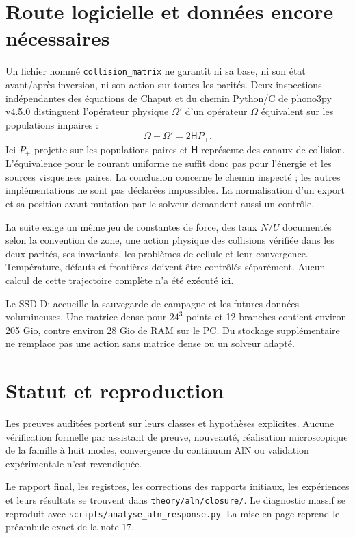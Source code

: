 \documentclass[11pt,a4paper]{article}
\begin{document}
\section{Route logicielle et données encore nécessaires}
Un fichier nommé \texttt{collision\_matrix} ne garantit ni sa base, ni son état avant/après inversion, ni son action sur toutes les parités.
Deux inspections indépendantes des équations de Chaput et du chemin Python/C de phono3py v4.5.0 distinguent l'opérateur physique $\Omega'$ d'un opérateur $\Omega$ équivalent sur les populations impaires :
\[
 \Omega-\Omega'=2\mathsf H P_+ .
\]
Ici $P_+$ projette sur les populations paires et $\mathsf H$ représente des canaux de collision.
L'équivalence pour le courant uniforme ne suffit donc pas pour l'énergie et les sources visqueuses paires.
La conclusion concerne le chemin inspecté ; les autres implémentations ne sont pas déclarées impossibles. La normalisation d'un export et sa position avant mutation par le solveur demandent aussi un contrôle.

La suite exige un même jeu de constantes de force, des taux $N/U$ documentés selon la convention de zone, une action physique des collisions vérifiée dans les deux parités, ses invariants, les problèmes de cellule et leur convergence. Température, défauts et frontières doivent être contrôlés séparément. Aucun calcul de cette trajectoire complète n'a été exécuté ici.

Le SSD D: accueille la sauvegarde de campagne et les futures données volumineuses.
Une matrice dense pour $24^3$ points et 12 branches contient environ 205 Gio, contre environ 28 Gio de RAM sur le PC. Du stockage supplémentaire ne remplace pas une action sans matrice dense ou un solveur adapté.

\section{Statut et reproduction}
Les preuves auditées portent sur leurs classes et hypothèses explicites.
Aucune vérification formelle par assistant de preuve, nouveauté, réalisation microscopique de la famille à huit modes, convergence du continuum AlN ou validation expérimentale n'est revendiquée.

Le rapport final, les registres, les corrections des rapports initiaux, les expériences et leurs résultats se trouvent dans \texttt{theory/aln/closure/}.
Le diagnostic massif se reproduit avec \texttt{scripts/analyse\_aln\_response.py}.
La mise en page reprend le préambule exact de la note 17.
\end{document}
